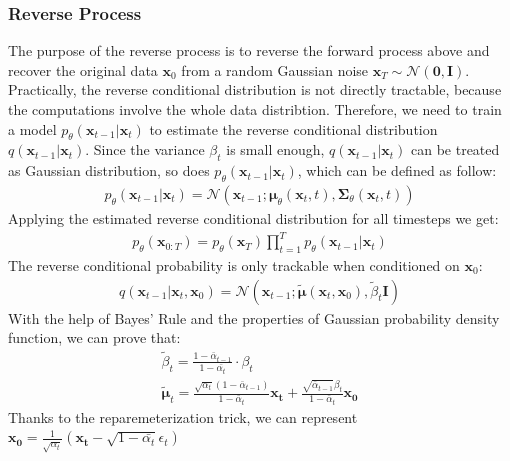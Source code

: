\documentclass[12pt,DIV14,BCOR12mm,a4paper,footinclude=false,headinclude,parskip=half-,twoside,openright,cleardoublepage=empty,toc=index,bibliography=totoc,listof=totoc]{scrreprt}
\numberwithin{equation}{chapter}
\begin{document}
\subsubsection{Reverse Process}
The purpose of the reverse process is to reverse the forward process above and recover the original data $\mathbf{x}_{0}$ from a random Gaussian noise $\mathbf{x}_{T} \sim \mathcal{N}(\mathbf{0}, \mathbf{I})$. Practically, the reverse conditional distribution is not directly tractable, because the computations involve the whole data distribtion. Therefore, we need to train a model $p_{\theta}(\mathbf{x}_{t-1}|\mathbf{x}_{t})$ to estimate the reverse conditional distribution $q(\mathbf{x}_{t-1}|\mathbf{x}_{t})$. Since the variance $\beta_{t}$ is small enough, $q(\mathbf{x}_{t-1}|\mathbf{x}_{t})$ can be treated as Gaussian distribution, so does $p_{\theta}(\mathbf{x}_{t-1}|\mathbf{x}_{t})$, which can be defined as follow:
\begin{align}\label{eq:reverse}
  p_{\theta}(\mathbf{x}_{t-1}|\mathbf{x}_{t}) = \mathcal{N}(\mathbf{x}_{t-1}; \boldsymbol{\mu}_{\theta}(\mathbf{x}_{t},t), \mathbf{\Sigma}_{\theta}(\mathbf{x}_{t},t))
\end{align}
Applying the estimated reverse conditional distribution for all timesteps we get:
\begin{align}\label{eq:reverse_all}
  p_{\theta}(\mathbf{x}_{0:T}) = p_{\theta}(\mathbf{x}_{T})\prod_{t=1}^{T}p_{\theta}(\mathbf{x}_{t-1}|\mathbf{x}_{t})
\end{align}
The reverse conditional probability is only trackable when conditioned on $\mathbf{x}_{0}$:
\begin{align}\label{eq:reverse_q}
  q(\mathbf{x}_{t-1}|\mathbf{x}_{t},\mathbf{x}_{0}) = \mathcal{N} (\mathbf{x}_{t-1}; \boldsymbol{\tilde{\mu}}(\mathbf{x}_{t}, \mathbf{x}_{0}), \tilde{\beta}_{t}\mathbf{I})
\end{align}
With the help of Bayes' Rule and the properties of Gaussian probability density function, we can prove that:
\begin{gather}
  \tilde{\beta}_{t} = \frac{1-\bar{\alpha}_{t-1}}{1-\bar{\alpha_{t}}} \cdot  \beta_{t}\\
  \boldsymbol{\tilde{\mu}}_{t} = \frac{\sqrt{\alpha_{t}}(1-\bar{\alpha}_{t-1})}{1-\bar{\alpha}_{t}}\mathbf{x_{t}} + \frac{\sqrt{\bar{\alpha}_{t-1}}\beta_{t}}{1-\bar{\alpha}_{t}}\mathbf{x_{0}}
\end{gather}
Thanks to the reparemeterization trick, we can represent $\mathbf{x_{0}} = \frac{1}{\sqrt{\alpha_{t}}}(\mathbf{x_{t}} - \sqrt{1-\bar{\alpha_{t}}}\epsilon_{t})$ 
\end{document}
